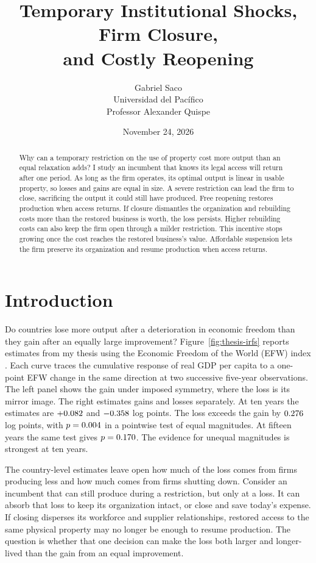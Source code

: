 \documentclass[11pt,letterpaper]{article}
\title{Temporary Institutional Shocks, Firm Closure,\\and Costly Reopening}
\author{Gabriel Saco\\Universidad del Pac\'ifico\\Professor Alexander Quispe}
\date{November 24, 2026}
\begin{document}
\maketitle
\begin{abstract}
Why can a temporary restriction on the use of property cost more output than an equal relaxation adds? I study an incumbent that knows its legal access will return after one period. As long as the firm operates, its optimal output is linear in usable property, so losses and gains are equal in size. A severe restriction can lead the firm to close, sacrificing the output it could still have produced. Free reopening restores production when access returns. If closure dismantles the organization and rebuilding costs more than the restored business is worth, the loss persists. Higher rebuilding costs can also keep the firm open through a milder restriction. This incentive stops growing once the cost reaches the restored business's value. Affordable suspension lets the firm preserve its organization and resume production when access returns.
\end{abstract}
\section{Introduction}
Do countries lose more output after a deterioration in economic freedom than they gain after an equally large improvement? Figure~\ref{fig:thesis-irfs} reports estimates from my thesis using the Economic Freedom of the World (EFW) index \citep{lawson2025}. Each curve traces the cumulative response of real GDP per capita to a one-point EFW change in the same direction at two successive five-year observations. The left panel shows the gain under imposed symmetry, where the loss is its mirror image. The right estimates gains and losses separately. At ten years the estimates are $+0.082$ and $-0.358$ log points. The loss exceeds the gain by $0.276$ log points, with $p=0.004$ in a pointwise test of equal magnitudes. At fifteen years the same test gives $p=0.170$. The evidence for unequal magnitudes is strongest at ten years.

The country-level estimates leave open how much of the loss comes from firms producing less and how much comes from firms shutting down. Consider an incumbent that can still produce during a restriction, but only at a loss. It can absorb that loss to keep its organization intact, or close and save today's expense. If closing disperses its workforce and supplier relationships, restored access to the same physical property may no longer be enough to resume production. The question is whether that one decision can make the loss both larger and longer-lived than the gain from an equal improvement.
\end{document}
